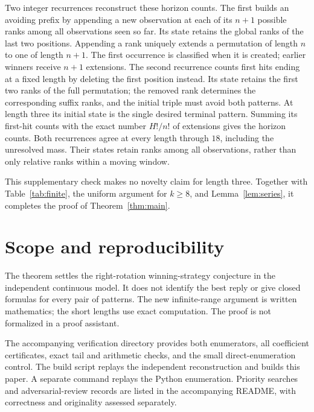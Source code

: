 \documentclass[11pt]{amsart}
\theoremstyle{remark}
\begin{document}
Two integer recurrences reconstruct these horizon counts. The first builds an avoiding prefix by appending a new observation at each of its $n+1$ possible ranks among all observations seen so far. Its state retains the global ranks of the last two positions. Appending a rank uniquely extends a permutation of length $n$ to one of length $n+1$. The first occurrence is classified when it is created; earlier winners receive $n+1$ extensions. The second recurrence counts first hits ending at a fixed length by deleting the first position instead. Its state retains the first two ranks of the full permutation; the removed rank determines the corresponding suffix ranks, and the initial triple must avoid both patterns. At length three its initial state is the single desired terminal pattern. Summing its first-hit counts with the exact number $H!/n!$ of extensions gives the horizon counts. Both recurrences agree at every length through $18$, including the unresolved mass. Their states retain ranks among all observations, rather than only relative ranks within a moving window.

This supplementary check makes no novelty claim for length three. Together with Table~\ref{tab:finite}, the uniform argument for $k\ge8$, and Lemma~\ref{lem:series}, it completes the proof of Theorem~\ref{thm:main}.

\section{Scope and reproducibility}

The theorem settles the right-rotation winning-strategy conjecture in the independent continuous model. It does not identify the best reply or give closed formulas for every pair of patterns. The new infinite-range argument is written mathematics; the short lengths use exact computation. The proof is not formalized in a proof assistant.

The accompanying verification directory provides both enumerators, all coefficient certificates, exact tail and arithmetic checks, and the small direct-enumeration control. The build script replays the independent reconstruction and builds this paper. A separate command replays the Python enumeration. Priority searches and adversarial-review records are listed in the accompanying README, with correctness and originality assessed separately.



\end{document}
